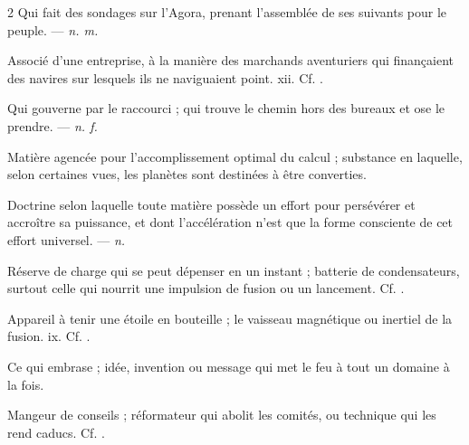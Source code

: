 \begin{multicols}{2}
 Qui fait des sondages sur l'Agora, prenant l'assemblée de ses suivants pour le peuple. —  \textit{n. m.}

 Associé d'une entreprise, à la manière des marchands aventuriers qui finançaient des navires sur lesquels ils ne naviguaient point.   xii. Cf. .

 Qui gouverne par le raccourci ; qui trouve le chemin hors des bureaux et ose le prendre. —  \textit{n. f.}

 Matière agencée pour l'accomplissement optimal du calcul ; substance en laquelle, selon certaines vues, les planètes sont destinées à être converties.

 Doctrine selon laquelle toute matière possède un effort pour persévérer et accroître sa puissance, et dont l'accélération n'est que la forme consciente de cet effort universel. —  \textit{n.}

 Réserve de charge qui se peut dépenser en un instant ; batterie de condensateurs, surtout celle qui nourrit une impulsion de fusion ou un lancement. Cf. .

 Appareil à tenir une étoile en bouteille ; le vaisseau magnétique ou inertiel de la fusion.   ix. Cf. .

 Ce qui embrase ; idée, invention ou message qui met le feu à tout un domaine à la fois.  

 Mangeur de conseils ; réformateur qui abolit les comités, ou technique qui les rend caducs. Cf. .


\end{multicols}
